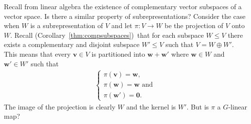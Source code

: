 \documentclass[12pt, a4paper, twoside]{article}
\theoremstyle{definition}
\theoremstyle{remark}
\numberwithin{equation}{section}
\newcommand{\1}{\mathbf{1}}
\newcommand{\0}{\mathbf{0}}
\newcommand{\vvec}{\mathbf{v}}
\newcommand{\wvec}{\mathbf{w}}
\begin{document}
	Recall from linear algebra the existence of complementary vector subspaces of a vector space. Is there a similar property of subrepresentations? Consider the case when $W$ is a subrepresentation of $V$ and let $\pi: V \rightarrow W$ be the projection of $V$ onto $W$. Recall (Corollary~\ref{thm:compsubspaces})~that for each subspace $W\leq V$ there exists a complementary and disjoint subspace $W' \leq V$ such that $V = W \oplus W'$. This means that every $\vvec \in V$ is partitioned into $\wvec + \wvec'$ where $\wvec \in W$ and $\wvec' \in W'$ such that 
	\begin{align*}
		\begin{cases}
			\pi(\vvec) = \wvec, \\
			\pi(\wvec) = \wvec \text{ and } \\
			\pi(\wvec') = \0.
		\end{cases}
	\end{align*}
	The image of the projection is clearly $W$ and the kernel is $W'$. But is $\pi$ a $G$-linear map?
\end{document}
